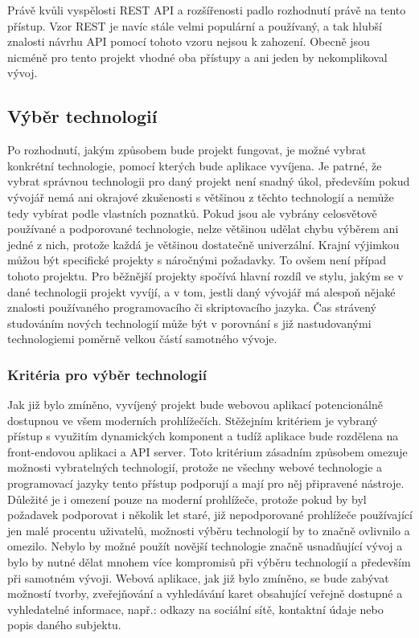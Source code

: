 	Právě kvůli vyspělosti \ac{REST} \ac{API} a rozšířenosti padlo rozhodnutí právě na tento přístup.
	Vzor \ac{REST} je navíc stále velmi populární a používaný, a tak hlubší znalosti návrhu \ac{API} pomocí tohoto vzoru
	nejsou k zahození.
	Obecně jsou nicméně pro tento projekt vhodné oba přístupy a ani jeden by nekomplikoval vývoj.

	\subsection{Výběr technologií}

	Po rozhodnutí, jakým způsobem bude projekt fungovat, je možné vybrat konkrétní technologie,
	pomocí kterých bude aplikace vyvíjena.
	Je patrné, že vybrat správnou technologii pro daný projekt není snadný úkol, především pokud vývojář
	nemá ani okrajové zkušenosti s většinou z těchto technologií a nemůže tedy vybírat podle vlastních poznatků.
	Pokud jsou ale vybrány celosvětově používané a podporované technologie, nelze většinou udělat chybu výběrem ani
	jedné z nich, protože každá je většinou dostatečně univerzální.
	Krajní výjimkou můžou být specifické projekty s náročnými požadavky.
	To ovšem není případ tohoto projektu.
	Pro běžnější projekty spočívá hlavní rozdíl ve stylu, jakým se v dané technologii
	projekt vyvíjí, a v tom, jestli daný vývojář má alespoň nějaké znalosti používaného programovacího či skriptovacího jazyka.
	Čas strávený studováním nových technologií může být v porovnání s již nastudovanými technologiemi
	poměrně velkou částí samotného vývoje.

		\subsubsection{Kritéria pro výběr technologií}

		Jak již bylo zmíněno, vyvíjený projekt bude webovou aplikací potencionálně dostupnou ve všem moderních prohlížečích.
		Stěžejním kritériem je vybraný přístup s využitím dynamických komponent a tudíž aplikace bude rozdělena
		na front-endovou aplikaci a \ac{API} server.
		Toto kritérium zásadním způsobem omezuje možnosti vybratelných technologií, protože ne všechny webové technologie
		a programovací jazyky tento přístup podporují a mají pro něj připravené nástroje.
		Důležité je i omezení pouze na moderní prohlížeče, protože pokud by byl požadavek podporovat i několik let staré,
		již nepodporované prohlížeče používající jen malé procentu uživatelů, možnosti výběru technologií by to značně
		ovlivnilo a omezilo.
		Nebylo by možné použít novější technologie značně usnadňující vývoj a bylo by nutné dělat mnohem více kompromisů
		při výběru technologií a především při samotném vývoji.
		Webová aplikace, jak již bylo zmíněno, se bude zabývat možností tvorby, zveřejňování a vyhledávání
		karet obsahující veřejně dostupné a vyhledatelné informace, např.: odkazy na sociální sítě,
		kontaktní údaje nebo popis daného subjektu.

